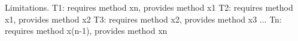 \begin{comment}
\item A \emph{desugaring} phase that translates well-typed source terms into
  \name terms. Source-level features such as multi-field records, type aliases
  are removed at this phase. The resulting program is just an \name term
  extended with some other constructs necessary for code generation.

\item A \emph{translation} phase that turns well-typed \name terms into System
  $F$ ones.
\end{enumerate}

Phase 3 is what we have formalized in this paper.


\paragraph{Reduce the number of coercions.}

Our translation inserts a coercion (many of them are identity functions)
whenever subtyping occurs during a function application, which could mean
notable run-time overhead. In the current implementation, we introduced a
partial evaluator with three simple rewriting rules to eliminate the redundant
identity functions as another compiler phase after the translation. In another
version of our implementation, partial evaluation is weaved into the process of
translation so that the unwanted identity functions are not introduced during
the translation. Besides, since the order of the two types in a binary
intersection does not matter, we may normalize them to avoid unnecessary
coercions.
\end{comment}

Limitations.
T1: requires method xn, provides method x1
T2: requires method x1, provides method x2
T3: requires method x2, provides method x3
...
Tn: requires method x(n-1), provides method xn

